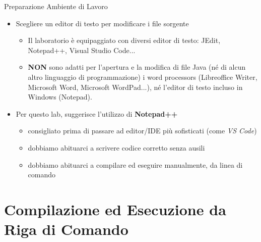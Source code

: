 \documentclass[xcolor=dvipsnames,presentation]{beamer}
\begin{document}
\begin{frame}{Preparazione Ambiente di Lavoro}
    \begin{itemize}
        \item Scegliere un editor di testo per modificare i file sorgente
        \begin{itemize}
            \item Il laboratorio è equipaggiato con diversi editor di testo: JEdit, Notepad++, Visual Studio Code...
            \item \textbf{NON} sono adatti per l'apertura e la modifica di file Java
            (né di alcun altro linguaggio di programmazione) i word processors (Libreoffice Writer, Microsoft Word, Microsoft WordPad...), né l'editor di testo incluso in Windows (Notepad).
        \end{itemize}

        \item Per questo lab, suggerisce l'utilizzo di \textbf{Notepad++}
        \begin{itemize}
            \item consigliato prima di passare ad editor/IDE più sofisticati (come \emph{VS Code})
            \item dobbiamo abituarci a scrivere codice corretto senza ausili
            \item dobbiamo abituarci a compilare ed eseguire manualmente, da linea di comando
        \end{itemize}
        
    \end{itemize}
\end{frame}

\section{Compilazione ed Esecuzione da Riga di Comando}
\end{document}
